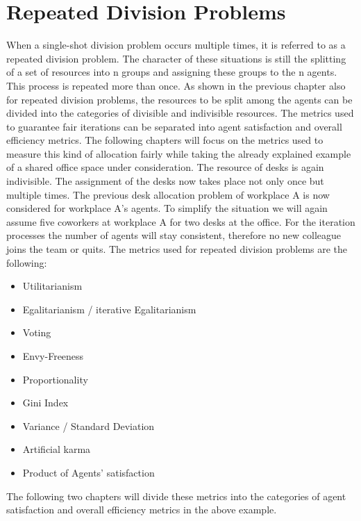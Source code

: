 \documentclass[german, a4paper, 11pt, oneside]{scrbook}
\begin{document}
\section{Repeated Division Problems}
When a single-shot division problem occurs multiple times, it is referred to as a repeated division problem. The character of these situations is still the splitting of a set of resources into n groups and assigning these groups to the n agents. This process is repeated more than once. As shown in the previous chapter also for repeated division problems, the resources to be split among the agents can be divided into the categories of divisible and indivisible resources. The metrics used to guarantee fair iterations can be separated into agent satisfaction and overall efficiency metrics. The following chapters will focus on the metrics used to measure this kind of allocation fairly while taking the already explained example of a shared office space under consideration. The resource of desks is again indivisible. The assignment of the desks now takes place not only once but multiple times. The previous desk allocation problem of workplace A is now considered for workplace A's agents. To simplify the situation we will again assume five coworkers at workplace A for two desks at the office. For the iteration processes the number of agents will stay consistent, therefore no new colleague joins the team or quits. The metrics used for repeated division problems are the following:
\begin{itemize}
  \item Utilitarianism
  \item Egalitarianism / iterative Egalitarianism
  \item Voting
  \item Envy-Freeness
  \item Proportionality
\item Gini Index
\item Variance / Standard Deviation
\item Artificial karma
\item Product of Agents' satisfaction
\end{itemize}
The following two chapters will divide these metrics into the categories of agent satisfaction and overall efficiency metrics in the above example.
\end{document}
